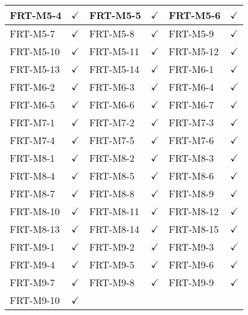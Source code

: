 \documentclass[12pt, titlepage]{article}
\begin{document}
\begin{longtable}{|l|c|l|c|l|c|}
	FRT-M5-4         & $\checkmark$    & FRT-M5-5         & $\checkmark$    & FRT-M5-6         & $\checkmark$    \\
	\midrule
	FRT-M5-7         & $\checkmark$    & FRT-M5-8         & $\checkmark$    & FRT-M5-9         & $\checkmark$    \\
	\midrule
	FRT-M5-10        & $\checkmark$    & FRT-M5-11        & $\checkmark$    & FRT-M5-12        & $\checkmark$    \\
	\midrule
	FRT-M5-13        & $\checkmark$    & FRT-M5-14        & $\checkmark$    & FRT-M6-1         & $\checkmark$    \\
	\midrule
	FRT-M6-2         & $\checkmark$    & FRT-M6-3         & $\checkmark$    & FRT-M6-4         & $\checkmark$    \\
	\midrule
	FRT-M6-5         & $\checkmark$    & FRT-M6-6         & $\checkmark$    & FRT-M6-7         & $\checkmark$    \\
	\midrule
	FRT-M7-1         & $\checkmark$    & FRT-M7-2         & $\checkmark$    & FRT-M7-3         & $\checkmark$    \\
	\midrule
	FRT-M7-4         & $\checkmark$    & FRT-M7-5         & $\checkmark$    & FRT-M7-6         & $\checkmark$    \\
	\midrule
	FRT-M8-1         & $\checkmark$    & FRT-M8-2         & $\checkmark$    & FRT-M8-3         & $\checkmark$    \\
	\midrule
	FRT-M8-4         & $\checkmark$    & FRT-M8-5         & $\checkmark$    & FRT-M8-6         & $\checkmark$    \\
	\midrule
	FRT-M8-7         & $\checkmark$    & FRT-M8-8         & $\checkmark$    & FRT-M8-9         & $\checkmark$    \\
	\midrule
	FRT-M8-10        & $\checkmark$    & FRT-M8-11        & $\checkmark$    & FRT-M8-12        & $\checkmark$    \\
	\midrule
	FRT-M8-13        & $\checkmark$    & FRT-M8-14        & $\checkmark$    & FRT-M8-15        & $\checkmark$    \\
	\midrule
	FRT-M9-1         & $\checkmark$    & FRT-M9-2         & $\checkmark$    & FRT-M9-3         & $\checkmark$    \\
	\midrule
	FRT-M9-4         & $\checkmark$    & FRT-M9-5         & $\checkmark$    & FRT-M9-6         & $\checkmark$    \\
	\midrule
	FRT-M9-7         & $\checkmark$    & FRT-M9-8         & $\checkmark$    & FRT-M9-9         & $\checkmark$    \\
	\midrule
	FRT-M9-10        & $\checkmark$    & ~                & ~               & ~                & ~               \\
	\bottomrule
\end{longtable}
\end{document}
